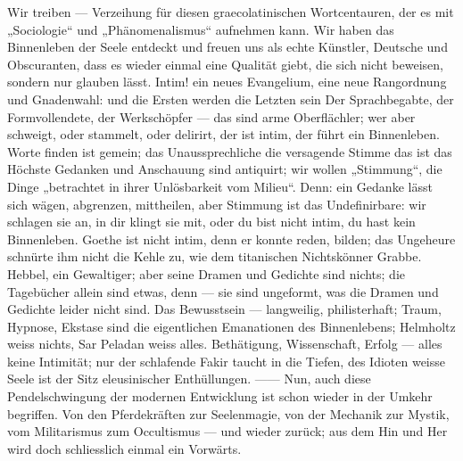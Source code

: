 Wir treiben  — Verzeihung für diesen graecolatinischen Wortcentauren, der es mit „Sociologie“ und „Phänomenalismus“ aufnehmen kann. Wir haben das Binnenleben der Seele entdeckt und freuen uns als echte Künstler, Deutsche und Obscuranten, dass es wieder einmal eine Qualität giebt, die sich nicht beweisen, sondern nur glauben lässt. Intim! ein neues Evangelium, eine neue Rangordnung und Gnadenwahl: und die Ersten werden die Letzten sein  Der Sprachbegabte, der Formvollendete, der Werkschöpfer — das sind arme Oberflächler; wer aber schweigt, oder stammelt, oder delirirt, der ist intim, der führt ein Binnenleben. Worte finden ist gemein; das Unaussprechliche  die versagende Stimme  das ist  das Höchste  Gedanken und Anschauung sind antiquirt; wir wollen „Stimmung“, die Dinge „betrachtet in ihrer Unlösbarkeit vom Milieu“. Denn: ein Gedanke lässt sich wägen, abgrenzen, mittheilen, aber Stimmung ist das Undefinirbare: wir schlagen sie an, in dir klingt sie mit, oder du bist nicht intim, du hast kein Binnenleben. Goethe ist nicht intim, denn er konnte reden, bilden; das Ungeheure schnürte ihm nicht die Kehle zu, wie dem titanischen Nichtskönner Grabbe. Hebbel, ein Gewaltiger; aber seine Dramen und Gedichte sind nichts; die Tagebücher allein sind etwas, denn — sie sind ungeformt, was die Dramen und Gedichte leider nicht sind. Das Bewusstsein — langweilig, philisterhaft; Traum, Hypnose, Ekstase sind die eigentlichen Emanationen des Binnenlebens; Helmholtz weiss nichts, Sar Peladan weiss alles. Bethätigung, Wissenschaft, Erfolg — alles keine Intimität; nur der schlafende Fakir taucht in die Tiefen, des Idioten weisse Seele ist der Sitz eleusinischer Enthüllungen. —— Nun, auch diese Pendelschwingung der modernen Entwicklung ist schon wieder in der Umkehr begriffen. Von den Pferdekräften zur Seelenmagie, von der Mechanik zur Mystik, vom Militarismus zum Occultismus — und wieder zurück; aus dem Hin und Her wird doch schliesslich einmal ein Vorwärts.
\par

